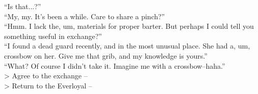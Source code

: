 “Is that...?”\\

“My, my. It’s been a while. Care to share a pinch?”\\

“Hmm. I lack the, um, materials for proper barter. But perhaps I could tell you something useful in exchange?”\\

“I found a dead guard recently, and in the most unusual place. She had a, um, crossbow on her. Give me that grib, and my knowledge is yours.”\\

“What? Of course I didn’t take it. Imagine me with a crossbow--haha.”\\

> Agree to the exchange -- \\
> Return to the Everloyal -- 